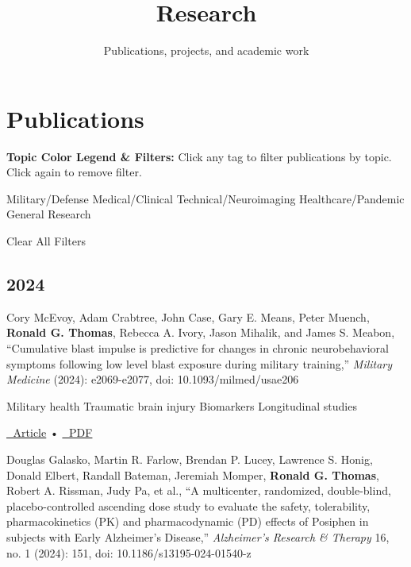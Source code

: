 \documentclass[
  letterpaper,
  DIV=11,
  numbers=noendperiod]{scrartcl}
\title{Research}
\subtitle{Publications, projects, and academic work}
\author{}
\date{}
\renewcommand*\contentsname{Table of contents}
\newcommand\contentsname{Table of contents}
\begin{document}
\maketitle

\renewcommand*\contentsname{Table of contents}
{
\hypersetup{linkcolor=}
\setcounter{tocdepth}{3}
\tableofcontents
}

\section{Publications}\label{publications}

\begin{tcolorbox}[enhanced jigsaw, opacityback=0, left=2mm, leftrule=.75mm, toprule=.15mm, rightrule=.15mm, breakable, arc=.35mm, colbacktitle=quarto-callout-note-color!10!white, colframe=quarto-callout-note-color-frame, bottomrule=.15mm, titlerule=0mm, coltitle=black, colback=white, toptitle=1mm, bottomtitle=1mm, title=\textcolor{quarto-callout-note-color}{\faInfo}\hspace{0.5em}{Note}, opacitybacktitle=0.6]

\textbf{Topic Color Legend \& Filters:} Click any tag to filter
publications by topic. Click again to remove filter.

{Military/Defense} {Medical/Clinical} {Technical/Neuroimaging}
{Healthcare/Pandemic} {General Research}

Clear All Filters

\end{tcolorbox}

\subsection{2024}\label{section}

Cory McEvoy, Adam Crabtree, John Case, Gary E. Means, Peter Muench,
\textbf{Ronald G. Thomas}, Rebecca A. Ivory, Jason Mihalik, and James S.
Meabon, ``Cumulative blast impulse is predictive for changes in chronic
neurobehavioral symptoms following low level blast exposure during
military training,'' \emph{Military Medicine} (2024): e2069-e2077, doi:
10.1093/milmed/usae206

{Military health} {Traumatic brain injury} {Biomarkers} {Longitudinal
studies}

\href{https://doi.org/10.1093/milmed/usae206}{🔗 Article} •
\href{https://doi.org/10.1093/milmed/usae206}{📄 PDF}

Douglas Galasko, Martin R. Farlow, Brendan P. Lucey, Lawrence S. Honig,
Donald Elbert, Randall Bateman, Jeremiah Momper, \textbf{Ronald G.
Thomas}, Robert A. Rissman, Judy Pa, et al., ``A multicenter,
randomized, double-blind, placebo-controlled ascending dose study to
evaluate the safety, tolerability, pharmacokinetics (PK) and
pharmacodynamic (PD) effects of Posiphen in subjects with Early
Alzheimer's Disease,'' \emph{Alzheimer's Research \& Therapy} 16, no. 1
(2024): 151, doi: 10.1186/s13195-024-01540-z
\end{document}
